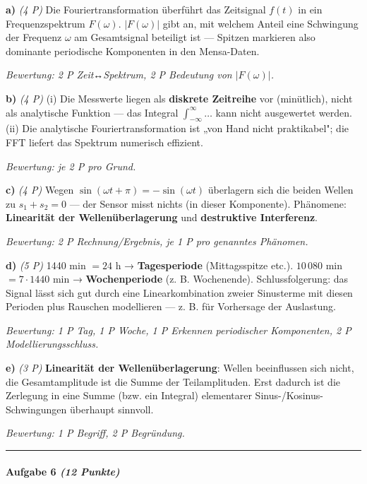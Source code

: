 \documentclass[11pt, a4paper]{article}
\begin{document}
\textbf{a)} \textit{(4 P)} Die Fouriertransformation überführt das Zeitsignal $f(t)$ in ein Frequenzspektrum $F(\omega)$. $|F(\omega)|$ gibt an, mit welchem Anteil eine Schwingung der Frequenz $\omega$ am Gesamtsignal beteiligt ist — Spitzen markieren also dominante periodische Komponenten in den Mensa-Daten.

\textit{Bewertung: 2 P Zeit↔Spektrum, 2 P Bedeutung von $|F(\omega)|$.}


\textbf{b)} \textit{(4 P)} (i) Die Messwerte liegen als \textbf{diskrete Zeitreihe} vor (minütlich), nicht als analytische Funktion — das Integral $\int_{-\infty}^\infty\dots$ kann nicht ausgewertet werden. (ii) Die analytische Fouriertransformation ist „von Hand nicht praktikabel"; die FFT liefert das Spektrum numerisch effizient.

\textit{Bewertung: je 2 P pro Grund.}


\textbf{c)} \textit{(4 P)} Wegen $\sin(\omega t + \pi) = -\sin(\omega t)$ überlagern sich die beiden Wellen zu $s_1 + s_2 = 0$ — der Sensor misst nichts (in dieser Komponente). Phänomene: \textbf{Linearität der Wellenüberlagerung} und \textbf{destruktive Interferenz}.

\textit{Bewertung: 2 P Rechnung/Ergebnis, je 1 P pro genanntes Phänomen.}


\textbf{d)} \textit{(5 P)} 1440 min $= 24$ h → \textbf{Tagesperiode} (Mittagsspitze etc.). $10\,080$ min $= 7 \cdot 1440$ min → \textbf{Wochenperiode} (z. B. Wochenende). Schlussfolgerung: das Signal lässt sich gut durch eine Linearkombination zweier Sinusterme mit diesen Perioden plus Rauschen modellieren — z. B. für Vorhersage der Auslastung.

\textit{Bewertung: 1 P Tag, 1 P Woche, 1 P Erkennen periodischer Komponenten, 2 P Modellierungsschluss.}


\textbf{e)} \textit{(3 P)} \textbf{Linearität der Wellenüberlagerung}: Wellen beeinflussen sich nicht, die Gesamtamplitude ist die Summe der Teilamplituden. Erst dadurch ist die Zerlegung in eine Summe (bzw. ein Integral) elementarer Sinus-/Kosinus-Schwingungen überhaupt sinnvoll.

\textit{Bewertung: 1 P Begriff, 2 P Begründung.}



\noindent\textcolor{rulegray}{\rule{\linewidth}{0.4pt}}


\paragraph{Aufgabe 6 \textit{(12 Punkte)}}\mbox{}\\[2pt]
\end{document}
